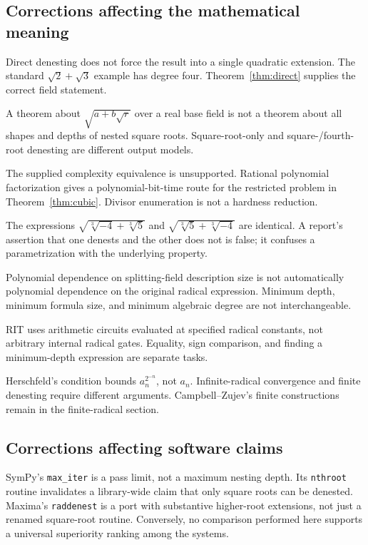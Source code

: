 \documentclass[11pt,a4paper]{article}
\numberwithin{equation}{section}
\theoremstyle{definition}\newtheorem{definition}[theorem]{Definition}
\theoremstyle{remark}\newtheorem{remark}[theorem]{Remark}
\begin{document}
\subsection{Corrections affecting the mathematical meaning}
\begin{description}[style=nextline,leftmargin=0pt,labelwidth=0pt]
\item[Quadratic versus multiquadratic.]
Direct denesting does not force the result into a single quadratic extension. The standard $\sqrt2+\sqrt3$ example has degree four. Theorem~\ref{thm:direct} supplies the correct field statement.
\item[Allowed root indices.]
A theorem about $\sqrt{a+b\sqrt r}$ over a real base field is not a theorem about all shapes and depths of nested square roots. Square-root-only and square-/fourth-root denesting are different output models.
\item[Cubic reducibility versus integer factorization.]
The supplied complexity equivalence is unsupported. Rational polynomial factorization gives a polynomial-bit-time route for the restricted problem in Theorem~\ref{thm:cubic}. Divisor enumeration is not a hardness reduction.
\item[An impossible asymmetry.]
The expressions $\sqrt{\sqrt[3]{-4}+\sqrt[3]5}$ and $\sqrt{\sqrt[3]5+\sqrt[3]{-4}}$ are identical. A report's assertion that one denests and the other does not is false; it confuses a parametrization with the underlying property.
\item[Field-size bounds.]
Polynomial dependence on splitting-field description size is not automatically polynomial dependence on the original radical expression. Minimum depth, minimum formula size, and minimum algebraic degree are not interchangeable.
\item[Identity testing.]
RIT uses arithmetic circuits evaluated at specified radical constants, not arbitrary internal radical gates. Equality, sign comparison, and finding a minimum-depth expression are separate tasks.
\item[Infinite radicals.]
Herschfeld's condition bounds $a_n^{2^{-n}}$, not $a_n$. Infinite-radical convergence and finite denesting require different arguments. Campbell--Zujev's finite constructions remain in the finite-radical section.
\end{description}

\subsection{Corrections affecting software claims}
SymPy's \texttt{max\_iter} is a pass limit, not a maximum nesting depth. Its \texttt{nthroot} routine invalidates a library-wide claim that only square roots can be denested. Maxima's \texttt{raddenest} is a port with substantive higher-root extensions, not just a renamed square-root routine. Conversely, no comparison performed here supports a universal superiority ranking among the systems.
\end{document}
